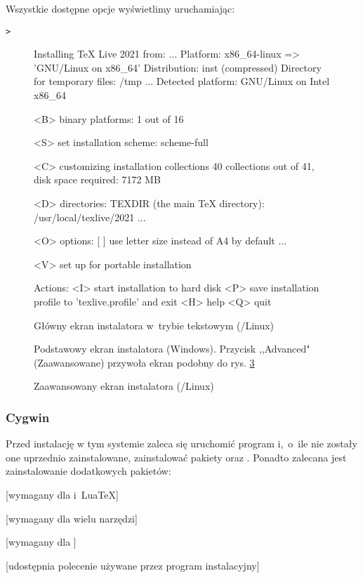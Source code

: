 \documentclass{article}
\begin{document}
Wszystkie dostępne opcje wyświetlimy uruchamiając:
\begin{alltt}
> 
\end{alltt}

\begin{figure}[tb]
\begin{boxedverbatim}
Installing TeX Live 2021 from: ...
Platform: x86_64-linux => 'GNU/Linux on x86_64'
Distribution: inst (compressed)
Directory for temporary files: /tmp
...
 Detected platform: GNU/Linux on Intel x86_64

 <B> binary platforms: 1 out of 16

 <S> set installation scheme: scheme-full

 <C> customizing installation collections
     40 collections out of 41, disk space required: 7172 MB

 <D> directories:
   TEXDIR (the main TeX directory):
     /usr/local/texlive/2021
   ...

 <O> options:
   [ ] use letter size instead of A4 by default
   ...

 <V> set up for portable installation

Actions:
 <I> start installation to hard disk
 <P> save installation profile to 'texlive.profile' and exit
 <H> help
 <Q> quit
\end{boxedverbatim}
\caption{Główny ekran instalatora w~trybie tekstowym  (\GNU/Linux)}\label{fig:text-main}
\end{figure}

\begin{figure}[tb]
\caption{Podstawowy ekran instalatora (Windows). Przycisk ,,Advanced" (Zaawansowane) przywoła ekran podobny do  rys. \ref{fig:advanced-lnx}}\label{fig:basic-w32}
\end{figure}

\begin{figure}[tb]
\caption{Zaawansowany ekran instalatora \GUI{}
  (\GNU/Linux)}\label{fig:advanced-lnx}
\end{figure}


\subsubsection{Cygwin}
\label{sec:cygwin}

Przed instalację w tym systemie zaleca się  uruchomić program
 i,~o~ile nie zostały one uprzednio zainstalowane,
zainstalować pakiety  oraz .
Ponadto zalecana jest zainstalowanie dodatkowych pakietów:
\begin{itemize*}
\item {} [wymagany dla \XeTeX{} i~Lua\TeX]
\item {} [wymagany dla wielu narzędzi]
\item {} [wymagany dla ]
\item {} [udostępnia polecenie 
używane przez program instalacyjny]
\end{itemize*}
\end{document}
